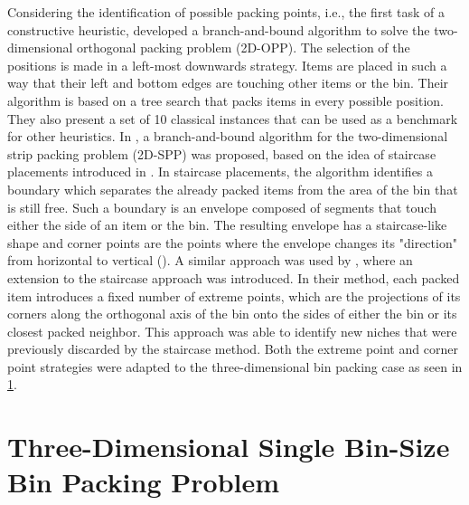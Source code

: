 Considering the identification of possible packing points, i.e., the first task of a constructive heuristic, \cite{Martello1998} developed a branch-and-bound algorithm to solve the two-dimensional orthogonal packing problem (2D-OPP).
The selection of the positions is made in a left-most downwards strategy. Items are placed in such a way that their left and bottom edges are touching other items or the bin.
Their algorithm is based on a tree search that packs items in every possible position.
They also present a set of 10 classical instances that can be used as a benchmark for other heuristics.
In \cite{martello2003exact}, a branch-and-bound algorithm for the two-dimensional strip packing problem (2D-SPP) was proposed, based on the idea of staircase placements introduced in \cite{scheithauer1995equivalence}.
In staircase placements, the algorithm identifies a boundary which separates the already packed items from the area of the bin that is still free.
Such a boundary is an envelope composed of segments that touch either the side of an item or the bin.
The resulting envelope has a staircase-like shape and corner points are the points where the envelope changes its "direction" from horizontal to vertical (\cite{martello2000three}).
A similar approach was used by \cite{crainic2008extreme}, where an extension to the staircase approach was introduced.
In their method, each packed item introduces a fixed number of extreme points, which are the projections of its corners along the orthogonal axis of the bin onto the sides of either the bin or its closest packed neighbor.
This approach was able to identify new niches that were previously discarded by the staircase method.
Both the extreme point and corner point strategies were adapted to the three-dimensional bin packing case as seen in \cref{sec:literature:3dbpp}.

\section{Three-Dimensional Single Bin-Size Bin Packing Problem}
\label{sec:literature:3dbpp}%

